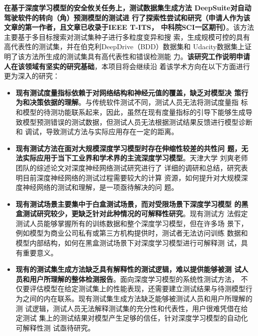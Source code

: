 \textbf{在基于深度学习模型的安全攸关任务上，测试数据集生成方法
	DeepSuite对自动驾驶软件的转向（角）预测模型的测试进
	行了探索性尝试和研究（申请人作为该文章的第一作者，且文章已收录于IEEE T-ITS，
	中科院SCI一区期刊）}。该方法主要基于多目标搜索对测试集种子进行多粒度变异和搜
	索，生成规模可控的具有高代表性的测试集，并在伯克利DeepDrive（BDD）数据集和
	Udacity数据集上证明了该方法所生成的测试集具有高代表性和错误检测能
	力。\textbf{该研究工作说明申请人在该领域有坚实的研究基础}，本项目将会继续沿
	着该学术方向在以下方面进行更为深入的研究：
\begin{itemize}
	\item \textbf{现有测试度量指标依赖于对网络结构和神经元值的覆盖，缺乏对模型决
	      策行为和决策依据的理解}。与传统软件测试不同，测试人员无法将测试度量指
	      标和模型的待测功能联系起来，因此，虽然在现有度量指标的引导下能够生成导
	      致模型预测错误的测试数据，但测试人员无法根据测试结果反馈进行模型诊断和
	      调试，导致测试方法与实际应用存在一定的距离。
	\item \textbf{现有测试方法在面对大规模深度学习模型时存在伸缩性较差的共性问
		      题，无法实际应用于当下工业界和学术界的主流深度学习模型}。天津大学
		      刘爽老师团队的综述论文对深度神经网络测试研究进行了
		      详细的调研和总结，研究表明目前深度神经网络的测试过程需要较大的计算
		      资源，如何提升对大规模深度神经网络的测试和理解，是一项亟待解决的问
		      题。
	\item \textbf{现有测试场景主要集中于白盒测试场景，而对受限场景下深度学习模型
		      的黑盒测试研究较少，更缺乏针对此种情况的可解释性研究}。现有测试方
		      法假定测试人员能够掌握所有的训练数据和整个深度学习模型，但在许多场
		      景下，例如模型为商业公司私有或第三方机构提供时，测试者无法访问训练
		      数据和模型内部结构，如何在黑盒测试场景下对深度学习模型进行可解释测
		      试，具有重要意义。
	\item \textbf{现有的测试集生成方法缺乏具有解释性的测试逻辑，难以提供能够被测
	      试人员和用户所理解的整体检测报告}。面向深度学习模型的系统性测试方法，
	      不仅要评估模型在给定测试集上的性能表现，还需要建立测试结果与待测模型行
	      为之间的内在联系。现有测试集生成方法缺乏能够被测试人员和用户所理解的测
	      试逻辑，测试人员无法解释测试集的充分性和代表性，用户很难凭借在给定测试
	      集上的测试结果对模型产生足够的信任，针对深度学习模型的自动化可解释性测
	      试亟待研究。
\end{itemize}




\begin{spacing}{1.3} %
	 \songti
	
	
	\vspace{11bp}
\end{spacing}
